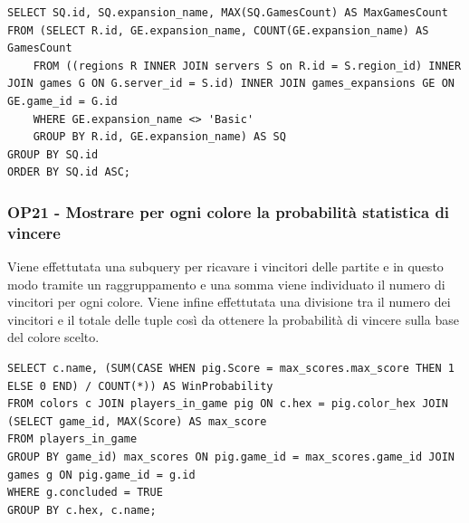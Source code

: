 \begin{lstlisting}[style=sql]
SELECT SQ.id, SQ.expansion_name, MAX(SQ.GamesCount) AS MaxGamesCount
FROM (SELECT R.id, GE.expansion_name, COUNT(GE.expansion_name) AS GamesCount
    FROM ((regions R INNER JOIN servers S on R.id = S.region_id) INNER JOIN games G ON G.server_id = S.id) INNER JOIN games_expansions GE ON GE.game_id = G.id
    WHERE GE.expansion_name <> 'Basic'
    GROUP BY R.id, GE.expansion_name) AS SQ
GROUP BY SQ.id
ORDER BY SQ.id ASC;
\end{lstlisting}

\subsubsection*{OP21 - Mostrare per ogni colore la probabilità statistica di vincere}
Viene effettutata una subquery per ricavare i vincitori delle partite e in questo modo tramite un raggruppamento e una somma viene individuato il numero di vincitori per ogni colore. Viene infine effettutata una divisione tra il numero dei vincitori e il totale delle tuple così da ottenere la probabilità di vincere sulla base del colore scelto.
\medskip

\begin{lstlisting}[style=sql]
SELECT c.name, (SUM(CASE WHEN pig.Score = max_scores.max_score THEN 1 ELSE 0 END) / COUNT(*)) AS WinProbability
FROM colors c JOIN players_in_game pig ON c.hex = pig.color_hex JOIN (SELECT game_id, MAX(Score) AS max_score
FROM players_in_game
GROUP BY game_id) max_scores ON pig.game_id = max_scores.game_id JOIN games g ON pig.game_id = g.id
WHERE g.concluded = TRUE
GROUP BY c.hex, c.name;
\end{lstlisting}
